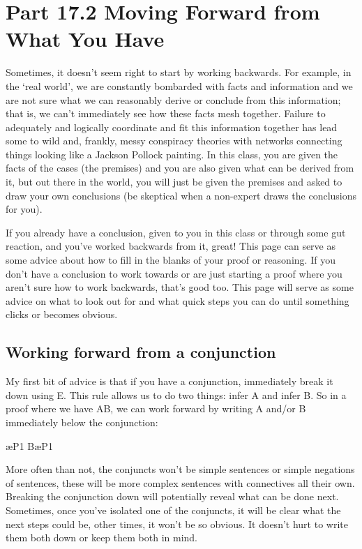 \section{Part 17.2 Moving Forward from What You Have}

Sometimes, it doesn't seem right to start by working backwards. For example, in the `real world', we are constantly bombarded with facts and information and we are not sure what we can reasonably derive or conclude from this information; that is, we can't immediately see how these facts mesh together. Failure to adequately and logically coordinate and fit this information together has lead some to wild and, frankly, messy conspiracy theories with networks connecting things looking like a Jackson Pollock painting. In this class, you are given the facts of the cases (the premises) and you are also given what can be derived from it, but out there in the world, you will just be given the premises and asked to draw your own conclusions (be skeptical when a non-expert draws the conclusions for you).

If you already have a conclusion, given to you in this class or through some gut reaction, and you've worked backwards from it, great! This page can serve as some advice about how to fill in the blanks of your proof or reasoning. If you don't have a conclusion to work towards or are just starting a proof where you aren't sure how to work backwards, that's good too. This page will serve as some advice on what to look out for and what quick steps you can do until something clicks or becomes obvious.

\subsection{Working forward from a conjunction}

My first bit of advice is that if you have a conjunction, immediately break it down using \eand E. This rule allows us to do two things: infer A and infer B. So in a proof where we have A\eand B, we can work forward by writing A and/or B immediately below the conjunction:
\begin{fitchproof}
\ae{P1}
B\ae{P1}	
\end{fitchproof}

More often than not, the conjuncts won't be simple sentences or simple negations of sentences, these will be more complex sentences with connectives all their own. Breaking the conjunction down will potentially reveal what can be done next. Sometimes, once you've isolated one of the conjuncts, it will be clear what the next steps could be, other times, it won't be so obvious. It doesn't hurt to write them both down or keep them both in mind.

